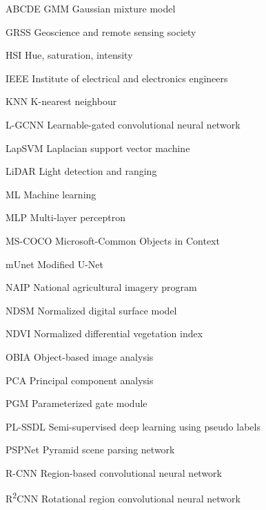 \begin{seznamzkratek}{ABCDE}
	      {GMM}
	      {Gaussian mixture model}

	      {GRSS}
	      {Geoscience and remote sensing society}

	      {HSI}
	      {Hue, saturation, intensity}

	      {IEEE}
	      {Institute of electrical and electronics engineers}

	      {KNN}
	      {K-nearest neighbour}

	      {L-GCNN}
	      {Learnable-gated convolutional neural network}

	      {LapSVM}
	      {Laplacian support vector machine}

	      {LiDAR}
	      {Light detection and ranging}

	      {ML}
	      {Machine learning}

	      {MLP}
	      {Multi-layer perceptron}

	      {MS-COCO}
	      {Microsoft-Common Objects in Context}

	      {mUnet}
	      {Modified U-Net}

	      {NAIP}
	      {National agricultural imagery program}

	      {NDSM}
	      {Normalized digital surface model}

	      {NDVI}
	      {Normalized differential vegetation index}

	      {OBIA}
	      {Object-based image analysis}

	      {PCA}
	      {Principal component analysis}

	      {PGM}
	      {Parameterized gate module}

	      {PL-SSDL}
	      {Semi-supervised deep learning using pseudo labels}

	      {PSPNet}
	      {Pyramid scene parsing network}

	      {R-CNN}
	      {Region-based convolutional neural network}

	      {R\textsuperscript{2}CNN}
	      {Rotational region convolutional neural network}


\end{seznamzkratek}
